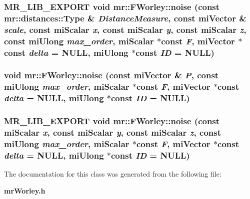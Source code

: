 \subsubsection{\setlength{\rightskip}{0pt plus 5cm}MR\_\-LIB\_\-EXPORT void mr::FWorley::noise (const {\bf mr::distances::Type} \& {\em Distance\-Measure}, const mi\-Vector \& {\em scale}, const mi\-Scalar {\em x}, const mi\-Scalar {\em y}, const mi\-Scalar {\em z}, const mi\-Ulong {\em max\_\-order}, mi\-Scalar $\ast$const {\em F}, mi\-Vector $\ast$const {\em delta} = NULL, mi\-Ulong $\ast$const {\em ID} = NULL)\hspace{0.3cm}{\tt  [static]}}\label{classmr_1_1FWorley_e2}


\subsubsection{\setlength{\rightskip}{0pt plus 5cm}void mr::FWorley::noise (const mi\-Vector \& {\em P}, const mi\-Ulong {\em max\_\-order}, mi\-Scalar $\ast$const {\em F}, mi\-Vector $\ast$const {\em delta} = NULL, mi\-Ulong $\ast$const {\em ID} = NULL)\hspace{0.3cm}{\tt  [inline, static]}}\label{classmr_1_1FWorley_e1}


\subsubsection{\setlength{\rightskip}{0pt plus 5cm}MR\_\-LIB\_\-EXPORT void mr::FWorley::noise (const mi\-Scalar {\em x}, const mi\-Scalar {\em y}, const mi\-Scalar {\em z}, const mi\-Ulong {\em max\_\-order}, mi\-Scalar $\ast$const {\em F}, mi\-Vector $\ast$const {\em delta} = NULL, mi\-Ulong $\ast$const {\em ID} = NULL)\hspace{0.3cm}{\tt  [static]}}\label{classmr_1_1FWorley_e0}




The documentation for this class was generated from the following file:\begin{CompactItemize}
\item 
{\bf mr\-Worley.h}\end{CompactItemize}
